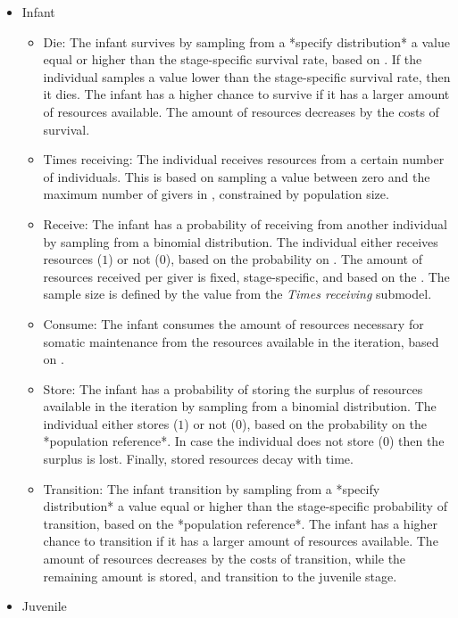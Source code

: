 \documentclass{article}
\begin{document}
\begin{itemize}
    \item Infant
    \begin{itemize}
        \item Die: The infant survives by sampling from a *specify distribution* a value equal or higher than the stage-specific survival rate, based on \cite{gurven2007longevity}. If the individual samples a value lower than the stage-specific survival rate, then it dies. The infant has a higher chance to survive if it has a larger amount of resources available. The amount of resources decreases by the costs of survival.
        \item Times receiving: The individual receives resources from a certain number of individuals. This is based on sampling a value between zero and the maximum number of givers in \cite{gurven2004give}, constrained by population size.
        \item Receive: The infant has a probability of receiving from another individual by sampling from a binomial distribution. The individual either receives resources ($1$) or not ($0$), based on the probability on \cite{gurven2004give}. The amount of resources received per giver is fixed, stage-specific, and based on the \cite{gurven2004give}. The sample size is defined by the value from the \emph{Times receiving} submodel. 
        \item Consume: The infant consumes the amount of resources necessary for somatic maintenance from the resources available in the iteration, based on \cite{kaplan2000theory}.
        \item Store: The infant has a probability of storing the surplus of resources available in the iteration by sampling from a binomial distribution. The individual either stores ($1$) or not ($0$), based on the probability on the *population reference*. In case the individual does not store ($0$) then the surplus is lost. Finally, stored resources decay with time.
        \item Transition: The infant transition by sampling from a *specify distribution* a value equal or higher than the stage-specific probability of transition, based on the *population reference*. The infant has a higher chance to transition if it has a larger amount of resources available. The amount of resources decreases by the costs of transition, while the remaining amount is stored, and transition to the juvenile stage.
    \end{itemize}
    \item Juvenile

\end{itemize}
\end{document}
